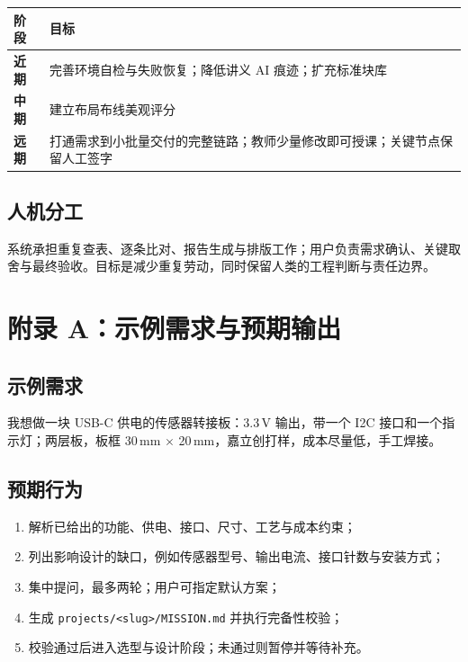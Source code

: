 \documentclass[11pt,a4paper]{ctexart}
\newcommand{\code}[1]{\texttt{\small #1}}
\begin{document}
\begin{center}
\small
\begin{tabularx}{\linewidth}{@{}>{\bfseries}p{2.0cm} >{\RaggedRight\arraybackslash}X@{}}
\toprule
\rowcolor{okbg}阶段 & 目标 \\
\midrule
近期 & 完善环境自检与失败恢复；降低讲义 AI 痕迹；扩充标准块库 \\
中期 & 建立布局布线美观评分 \\
远期 & 打通需求到小批量交付的完整链路；教师少量修改即可授课；关键节点保留人工签字 \\
\bottomrule
\end{tabularx}
\end{center}

\subsection{人机分工}

系统承担重复查表、逐条比对、报告生成与排版工作；用户负责需求确认、关键取舍与最终验收。目标是减少重复劳动，同时保留人类的工程判断与责任边界。

\section{附录 A：示例需求与预期输出}

\subsection{示例需求}

\begin{leadbox}
我想做一块 USB-C 供电的传感器转接板：3.3\,V 输出，带一个 I2C 接口和一个指示灯；两层板，板框 30\,mm $\times$ 20\,mm，嘉立创打样，成本尽量低，手工焊接。
\end{leadbox}

\subsection{预期行为}

\begin{enumerate}
  \item 解析已给出的功能、供电、接口、尺寸、工艺与成本约束；
  \item 列出影响设计的缺口，例如传感器型号、输出电流、接口针数与安装方式；
  \item 集中提问，最多两轮；用户可指定默认方案；
  \item 生成 \code{projects/<slug>/MISSION.md} 并执行完备性校验；
  \item 校验通过后进入选型与设计阶段；未通过则暂停并等待补充。
\end{enumerate}
\end{document}
